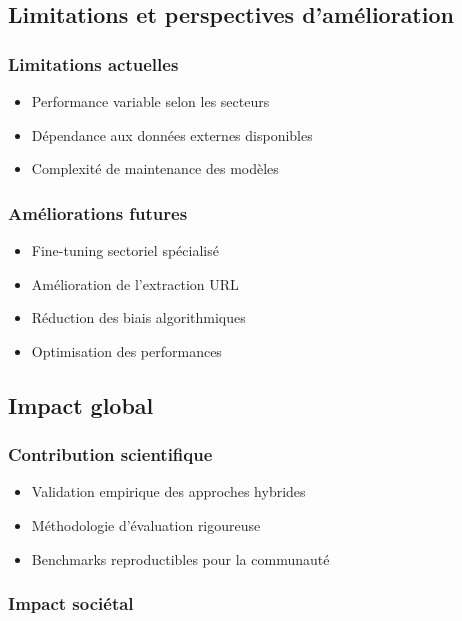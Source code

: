 \documentclass[12pt,a4paper]{report}
\begin{document}
\subsection{Limitations et perspectives d'amélioration}

\subsubsection{Limitations actuelles}

\begin{itemize}
\item Performance variable selon les secteurs
\item Dépendance aux données externes disponibles
\item Complexité de maintenance des modèles
\end{itemize}

\subsubsection{Améliorations futures}

\begin{itemize}
\item Fine-tuning sectoriel spécialisé
\item Amélioration de l'extraction URL
\item Réduction des biais algorithmiques
\item Optimisation des performances
\end{itemize}

\subsection{Impact global}

\subsubsection{Contribution scientifique}

\begin{itemize}
\item Validation empirique des approches hybrides
\item Méthodologie d'évaluation rigoureuse
\item Benchmarks reproductibles pour la communauté
\end{itemize}

\subsubsection{Impact sociétal}
\end{document}
